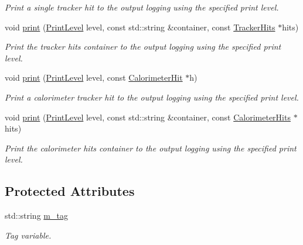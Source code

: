 \begin{DoxyCompactItemize}
\begin{DoxyCompactList}\small\item\em Print a single tracker hit to the output logging using the specified print level. \item\end{DoxyCompactList}\item 
void \hyperlink{class_d_d4hep_1_1_simulation_1_1_geant4_data_dump_a2427e186357f34940bb19be59406e7c9}{print} (\hyperlink{namespace_d_d4hep_a5b5a64d56252469451f2020a27d57d42}{PrintLevel} level, const std::string \&container, const \hyperlink{class_d_d4hep_1_1_simulation_1_1_geant4_data_dump_aa71f3341672792aa15c10e82cdbeca4b}{TrackerHits} $\ast$hits)
\begin{DoxyCompactList}\small\item\em Print the tracker hits container to the output logging using the specified print level. \item\end{DoxyCompactList}\item 
void \hyperlink{class_d_d4hep_1_1_simulation_1_1_geant4_data_dump_a213bbcf2c9fb78f71afefe34935f3017}{print} (\hyperlink{namespace_d_d4hep_a5b5a64d56252469451f2020a27d57d42}{PrintLevel} level, const \hyperlink{class_d_d4hep_1_1_simulation_1_1_geant4_calorimeter_1_1_hit}{CalorimeterHit} $\ast$h)
\begin{DoxyCompactList}\small\item\em Print a calorimeter tracker hit to the output logging using the specified print level. \item\end{DoxyCompactList}\item 
void \hyperlink{class_d_d4hep_1_1_simulation_1_1_geant4_data_dump_aedbce540469e2c554096f3b87fbd9991}{print} (\hyperlink{namespace_d_d4hep_a5b5a64d56252469451f2020a27d57d42}{PrintLevel} level, const std::string \&container, const \hyperlink{class_d_d4hep_1_1_simulation_1_1_geant4_data_dump_a405c85a9a72c4f1dc0164d4a61d98f75}{CalorimeterHits} $\ast$hits)
\begin{DoxyCompactList}\small\item\em Print the calorimeter hits container to the output logging using the specified print level. \item\end{DoxyCompactList}\end{DoxyCompactItemize}
\subsection*{Protected Attributes}
\begin{DoxyCompactItemize}
\item 
std::string \hyperlink{class_d_d4hep_1_1_simulation_1_1_geant4_data_dump_a58986bd9d08cd72f5d5b780d0047e5e6}{m\_\-tag}
\begin{DoxyCompactList}\small\item\em Tag variable. \item\end{DoxyCompactList}\end{DoxyCompactItemize}


